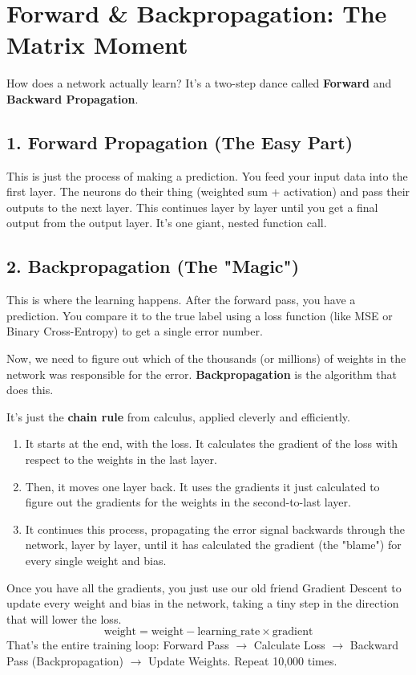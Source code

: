 \documentclass[11pt, letterpaper, openany]{book}
\begin{document}
\section{Forward \& Backpropagation: The Matrix Moment}

How does a network actually learn? It's a two-step dance called \textbf{Forward} and \textbf{Backward Propagation}.

\subsection{1. Forward Propagation (The Easy Part)}

This is just the process of making a prediction. You feed your input data into the first layer. The neurons do their thing (weighted sum + activation) and pass their outputs to the next layer. This continues layer by layer until you get a final output from the output layer. It's one giant, nested function call.

\subsection{2. Backpropagation (The "Magic")}

This is where the learning happens. After the forward pass, you have a prediction. You compare it to the true label using a loss function (like MSE or Binary Cross-Entropy) to get a single error number.

Now, we need to figure out which of the thousands (or millions) of weights in the network was responsible for the error. \textbf{Backpropagation} is the algorithm that does this.

It's just the \textbf{chain rule} from calculus, applied cleverly and efficiently.
\begin{enumerate}
    \item It starts at the end, with the loss. It calculates the gradient of the loss with respect to the weights in the last layer.
    \item Then, it moves one layer back. It uses the gradients it just calculated to figure out the gradients for the weights in the second-to-last layer.
    \item It continues this process, propagating the error signal backwards through the network, layer by layer, until it has calculated the gradient (the "blame") for every single weight and bias.
\end{enumerate}
Once you have all the gradients, you just use our old friend Gradient Descent to update every weight and bias in the network, taking a tiny step in the direction that will lower the loss.
\[ \text{weight} = \text{weight} - \text{learning\_rate} \times \text{gradient} \]
That's the entire training loop: Forward Pass $\rightarrow$ Calculate Loss $\rightarrow$ Backward Pass (Backpropagation) $\rightarrow$ Update Weights. Repeat 10,000 times.
\end{document}
